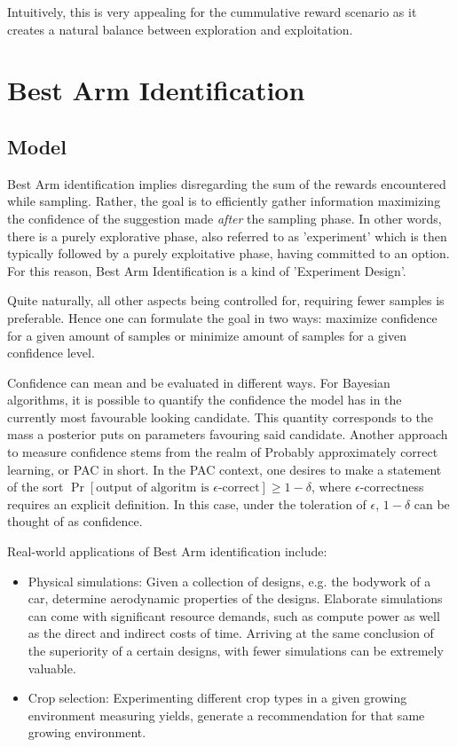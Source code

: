 Intuitively, this is very appealing for the cummulative reward scenario as it creates a natural balance between exploration and exploitation.

\section{Best Arm Identification}
\subsection{Model}\label{ss:top-1_model}

Best Arm identification implies disregarding the sum of the rewards encountered while sampling. Rather, the goal is to efficiently gather information maximizing the confidence of the suggestion made \emph{after} the sampling phase. In other words, there is a purely explorative phase, also referred to as 'experiment' which is then typically followed by a purely exploitative phase, having committed to an option. For this reason, Best Arm Identification is a kind of 'Experiment Design'.

Quite naturally, all other aspects being controlled for, requiring fewer samples is preferable. Hence one can formulate the goal in two ways: maximize confidence for a given amount of samples or minimize amount of samples for a given confidence level.

Confidence can mean and be evaluated in different ways. For Bayesian algorithms, it is possible to quantify the confidence the model has in the currently most favourable looking candidate. This quantity corresponds to the mass a posterior puts on parameters favouring said candidate. Another approach to measure confidence stems from the realm of Probably approximately correct learning, or PAC in short. In the PAC context, one desires to make a statement of the sort $\Pr[\text{output of algoritm is $\epsilon$-correct}] \geq 1 - \delta$, where $\epsilon$-correctness requires an explicit definition. In this case, under the toleration of $\epsilon$, $1 - \delta$ can be thought of as confidence.

Real-world applications of Best Arm identification include:
\begin{itemize}
  \item Physical simulations: Given a collection of designs, e.g. the bodywork of a car, determine aerodynamic properties of the designs. Elaborate simulations can come with significant resource demands, such as compute power as well as the direct and indirect costs of time. Arriving at the same conclusion of the superiority of a certain designs, with fewer simulations can be extremely valuable.
  \item Crop selection: Experimenting different crop types in a given growing environment measuring yields, generate a recommendation for that same growing environment.
\end{itemize}

